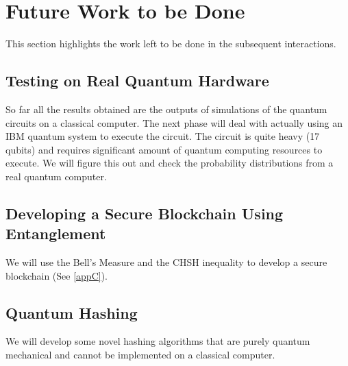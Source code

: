 \section{Future Work to be Done}
This section highlights the work left to be done in the subsequent interactions.
\subsection{Testing on Real Quantum Hardware}
So far all the results obtained are the outputs of simulations of the quantum circuits on a classical computer. The next phase will deal with actually using an IBM quantum system to execute the circuit. The circuit is quite heavy (17 qubits) and requires significant amount of quantum computing resources to execute. We will figure this out and check the probability distributions from a real quantum computer\cite{qsys}. 
\subsection{Developing a Secure Blockchain Using Entanglement}
We will use the Bell's Measure and the CHSH inequality to develop a secure blockchain\cite{ent}\cite{qkd} (See \ref{appC}).
\subsection{Quantum Hashing}
We will develop some novel hashing algorithms that are purely quantum mechanical and cannot be implemented on a classical computer.